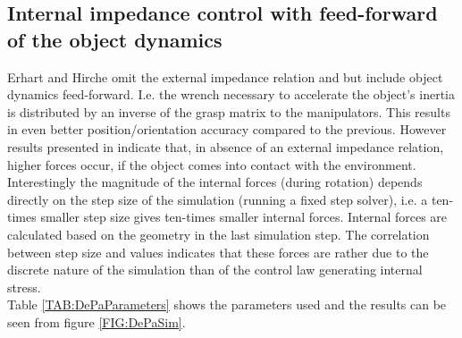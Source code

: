 \documentclass[a4paper,twoside, openright,12pt]{report}
\begin{document}
{\subsection{Internal impedance control with feed-forward of the object dynamics}
Erhart and Hirche \cite{Erhart_16} omit the external impedance relation and but include object dynamics feed-forward. I.e. the wrench necessary to accelerate the object's inertia is distributed by an inverse of the grasp matrix to the manipulators. This results in even better position/orientation accuracy compared to the previous. However results presented in \cite{Caccavale_08} indicate that, in absence of an external impedance relation, higher forces occur, if the object comes into contact with the environment.\\
Interestingly the magnitude of the internal forces (during rotation) depends directly on the step size of the simulation (running a fixed step solver), i.e. a ten-times smaller step size gives ten-times smaller internal forces. Internal forces are calculated based on the geometry in the last simulation step. The correlation between step size and values indicates that these forces are rather due to the discrete nature of the simulation than of the control law generating internal stress.\\
Table \ref{TAB:DePaParameters} shows the parameters used and the results can be seen from figure \ref{FIG:DePaSim}.


}
\end{document}
